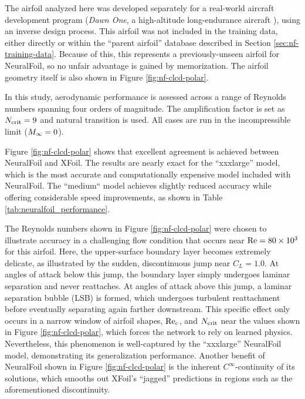 The airfoil analyzed here was developed separately for a real-world aircraft development program (\emph{Dawn One}, a high-altitude long-endurance aircraft \cite{sharpe_optimization_2021, sharpe_tailerons_2023}), using an inverse design process. This airfoil was not included in the training data, either directly or within the ``parent airfoil'' database described in Section \ref{sec:nf-training-data}. Because of this, this represents a previously-unseen airfoil for NeuralFoil, so no unfair advantage is gained by memorization. The airfoil geometry itself is also shown in Figure \ref{fig:nf-clcd-polar}.

In this study, aerodynamic performance is assessed across a range of Reynolds numbers spanning four orders of magnitude. The amplification factor is set as $N_{\rm crit}=9$ and natural transition is used. All cases are run in the incompressible limit ($M_\infty=0$).

Figure \ref{fig:nf-clcd-polar} shows that excellent agreement is achieved between NeuralFoil and XFoil. The results are nearly exact for the ``xxxlarge'' model, which is the most accurate and computationally expensive model included with NeuralFoil. The ``medium`` model achieves slightly reduced accuracy while offering considerable speed improvements, as shown in Table \ref{tab:neuralfoil_performance}.

The Reynolds numbers shown in Figure \ref{fig:nf-clcd-polar} were chosen to illustrate accuracy in a challenging flow condition that occurs near $\rm Re=80 \times 10^3$ for this airfoil. Here, the upper-surface boundary layer becomes extremely delicate, as illustrated by the sudden, discontinuous jump near $C_L=1.0$. At angles of attack below this jump, the boundary layer simply undergoes laminar separation and never reattaches. At angles of attack above this jump, a laminar separation bubble (LSB) is formed, which undergoes turbulent reattachment before eventually separating again farther downstream. This specific effect only occurs in a narrow window of airfoil shapes, $\rm Re_c$, and $N_{\rm crit}$ near the values shown in Figure \ref{fig:nf-clcd-polar}, which forces the network to rely on learned physics. Nevertheless, this phenomenon is well-captured by the ``xxxlarge'' NeuralFoil model, demonstrating its generalization performance. Another benefit of NeuralFoil shown in Figure \ref{fig:nf-clcd-polar} is the inherent $C^\infty$-continuity of its solutions, which smooths out XFoil's ``jagged'' predictions in regions such as the aforementioned discontinuity.


